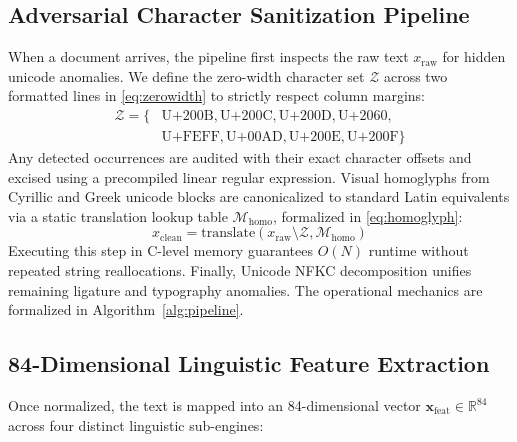 \documentclass[conference]{IEEEtran}
\begin{document}
\subsection{Adversarial Character Sanitization Pipeline}
When a document arrives, the pipeline first inspects the raw text $x_{\text{raw}}$ for hidden unicode anomalies. We define the zero-width character set $\mathcal{Z}$ across two formatted lines in \eqref{eq:zerowidth} to strictly respect column margins:
\begin{equation}
\label{eq:zerowidth}
\begin{aligned}
    \mathcal{Z} = \{ & \text{U+200B}, \text{U+200C}, \text{U+200D}, \text{U+2060}, \\
                     & \text{U+FEFF}, \text{U+00AD}, \text{U+200E}, \text{U+200F} \}
\end{aligned}
\end{equation}
Any detected occurrences are audited with their exact character offsets and excised using a precompiled linear regular expression. Visual homoglyphs from Cyrillic and Greek unicode blocks are canonicalized to standard Latin equivalents via a static translation lookup table $\mathcal{M}_{\text{homo}}$, formalized in \eqref{eq:homoglyph}:
\begin{equation}
\label{eq:homoglyph}
    x_{\text{clean}} = \text{translate}(x_{\text{raw}} \setminus \mathcal{Z}, \mathcal{M}_{\text{homo}})
\end{equation}
Executing this step in C-level memory guarantees $O(N)$ runtime without repeated string reallocations. Finally, Unicode NFKC decomposition unifies remaining ligature and typography anomalies. The operational mechanics are formalized in Algorithm~\ref{alg:pipeline}.

\subsection{84-Dimensional Linguistic Feature Extraction}
Once normalized, the text is mapped into an 84-dimensional vector $\mathbf{x}_{\text{feat}} \in \mathbb{R}^{84}$ across four distinct linguistic sub-engines:
\end{document}
